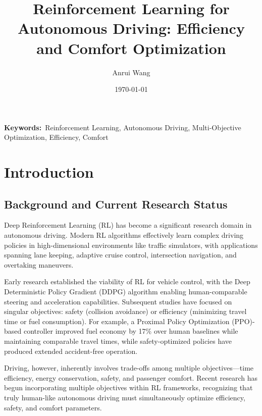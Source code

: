 \documentclass[12pt,a4paper]{article}
\title{\Large Reinforcement Learning for Autonomous Driving: Efficiency and Comfort Optimization}
\author{Anrui Wang}
\date{\today}
\begin{document}
\sloppy

\maketitle

\begin{abstract}
    
\end{abstract}

\textbf{Keywords:}~Reinforcement Learning, Autonomous Driving, Multi-Objective Optimization, Efficiency, Comfort\hfill\null

\section{Introduction}

\subsection{Background and Current Research Status}
Deep Reinforcement Learning (RL) has become a significant research domain in autonomous driving. Modern RL algorithms effectively learn complex driving policies in high-dimensional environments like traffic simulators\cite{jin2025}, with applications spanning lane keeping, adaptive cruise control, intersection navigation, and overtaking maneuvers.

Early research established the viability of RL for vehicle control, with the Deep Deterministic Policy Gradient (DDPG) algorithm enabling human-comparable steering and acceleration capabilities\cite{zhu2020}. Subsequent studies have focused on singular objectives: safety (collision avoidance) or efficiency (minimizing travel time or fuel consumption). For example, a Proximal Policy Optimization (PPO)-based controller improved fuel economy by 17\% over human baselines while maintaining comparable travel times\cite{zhu2021}, while safety-optimized policies have produced extended accident-free operation\cite{survey2023}.

Driving, however, inherently involves trade-offs among multiple objectives—time efficiency, energy conservation, safety, and passenger comfort. Recent research has begun incorporating multiple objectives within RL frameworks, recognizing that truly human-like autonomous driving must simultaneously optimize efficiency, safety, and comfort parameters.
\end{document}
